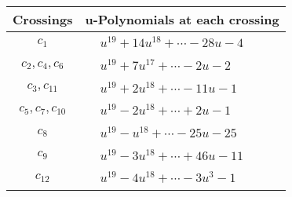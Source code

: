 \documentclass[1p]{elsarticle_modified}
\theoremstyle{definition}
\begin{document}
\begin{tabular}{m{50pt}|m{274pt}}
Crossings & \hspace{64pt}u-Polynomials at each crossing \\
\hline $$\begin{aligned}c_{1}\end{aligned}$$&$\begin{aligned}
&u^{19}+14 u^{18}+\cdots-28 u-4
\end{aligned}$\\
\hline $$\begin{aligned}c_{2},c_{4},c_{6}\end{aligned}$$&$\begin{aligned}
&u^{19}+7 u^{17}+\cdots-2 u-2
\end{aligned}$\\
\hline $$\begin{aligned}c_{3},c_{11}\end{aligned}$$&$\begin{aligned}
&u^{19}+2 u^{18}+\cdots-11 u-1
\end{aligned}$\\
\hline $$\begin{aligned}c_{5},c_{7},c_{10}\end{aligned}$$&$\begin{aligned}
&u^{19}-2 u^{18}+\cdots+2 u-1
\end{aligned}$\\
\hline $$\begin{aligned}c_{8}\end{aligned}$$&$\begin{aligned}
&u^{19}- u^{18}+\cdots-25 u-25
\end{aligned}$\\
\hline $$\begin{aligned}c_{9}\end{aligned}$$&$\begin{aligned}
&u^{19}-3 u^{18}+\cdots+46 u-11
\end{aligned}$\\
\hline $$\begin{aligned}c_{12}\end{aligned}$$&$\begin{aligned}
&u^{19}-4 u^{18}+\cdots-3 u^3-1
\end{aligned}$\\
\hline
\end{tabular}\\~\\
\newpage\renewcommand{\arraystretch}{1}
\end{document}
